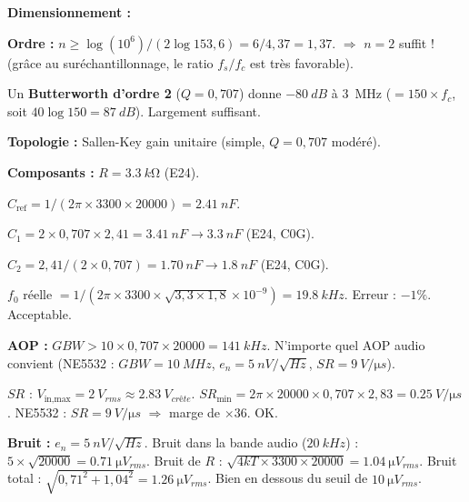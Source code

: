 \documentclass[12pt,a4paper,twoside]{book}
\begin{document}
\begin{pratique}
\textbf{Dimensionnement :}

\textbf{Ordre :} $n \geq \log(10^6)/(2\log153{,}6) = 6/4{,}37 = 1{,}37$. $\Rightarrow$ $n = 2$ suffit ! (grâce au suréchantillonnage, le ratio $f_s/f_c$ est très favorable).

Un \textbf{Butterworth d'ordre 2} ($Q = 0{,}707$) donne $\SI{-80}{dB}$ à \SI{3}{MHz} ($= 150\times f_c$, soit $40\log150 = \SI{87}{dB}$). Largement suffisant.

\textbf{Topologie :} Sallen-Key gain unitaire (simple, $Q = 0{,}707$ modéré).

\textbf{Composants :} $R = \SI{3.3}{k\ohm}$ (E24).

$C_{\text{ref}} = 1/(2\pi\times3300\times20000) = \SI{2.41}{nF}$.

$C_1 = 2\times0{,}707\times2{,}41 = \SI{3.41}{nF} \to \SI{3.3}{nF}$ (E24, C0G).

$C_2 = 2{,}41/(2\times0{,}707) = \SI{1.70}{nF} \to \SI{1.8}{nF}$ (E24, C0G).

$f_0$ réelle $= 1/(2\pi\times3300\times\sqrt{3{,}3\times1{,}8}\times10^{-9}) = \SI{19.8}{kHz}$. Erreur : $-1\%$. Acceptable.

\textbf{AOP :} $GBW > 10\times0{,}707\times20000 = \SI{141}{kHz}$. N'importe quel AOP audio convient (NE5532 : $GBW = \SI{10}{MHz}$, $e_n = \SI{5}{nV/\sqrt{Hz}}$, $SR = \SI{9}{V/\micro s}$).

$SR$ : $V_{\text{in,max}} = \SI{2}{V_{rms}} \approx \SI{2.83}{V_{crête}}$. $SR_{\min} = 2\pi\times20000\times0{,}707\times2{,}83 = \SI{0.25}{V/\micro s}$. NE5532 : $SR = \SI{9}{V/\micro s}$ $\Rightarrow$ marge de $\times 36$. OK.

\textbf{Bruit :} $e_n = \SI{5}{nV/\sqrt{Hz}}$. Bruit dans la bande audio ($\SI{20}{kHz}$) : $5\times\sqrt{20000} = \SI{0.71}{\micro V_{rms}}$. Bruit de $R$ : $\sqrt{4kT\times3300\times20000} = \SI{1.04}{\micro V_{rms}}$. Bruit total : $\sqrt{0{,}71^2+1{,}04^2} = \SI{1.26}{\micro V_{rms}}$. Bien en dessous du seuil de $\SI{10}{\micro V_{rms}}$.
\end{pratique}
\end{document}
